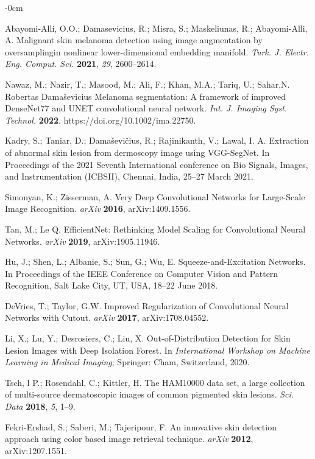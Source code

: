\documentclass[sensors,article,accept,pdftex,moreauthors]{Definitions/mdpi}
\begin{document}
\begin{adjustwidth}{-\extralength}{0cm}
\begin{thebibliography}{999}
Abayomi-Alli, O.O.; Damasevicius, R.; Misra, S.; Maskeliunas, R.; Abayomi-Alli, A. Malignant skin melanoma detection using image augmentation by oversamplingin nonlinear lower-dimensional embedding manifold. \emph{Turk. J. Electr. Eng. Comput. Sci.} {\bf 2021}, \emph{29}, 2600--2614.

Nawaz, M.; Nazir, T.; Masood, M.; Ali, F.;
Khan, M.A.; Tariq, U.; Sahar,N. 
Robertas Damaševicius Melanoma segmentation: A framework of improved DenseNet77 and UNET convolutional neural network.
{\em Int. J. Imaging Syst. Technol.} 
{\bf 2022}. https://doi.org/10.1002/ima.22750.

Kadry, S.; Taniar, D.; Damaševičius, R.; Rajinikanth, V.; Lawal, I. A. Extraction of abnormal skin lesion from dermoscopy image using VGG-SegNet. In Proceedings of the 2021 Seventh International conference on Bio Signals, Images, and Instrumentation (ICBSII), Chennai, India, 25--27 March 2021.

Simonyan, K.; Zisserman, A. Very Deep Convolutional Networks for Large-Scale Image Recognition.
{\em arXiv} 
{\bf 2016}, arXiv:1409.1556.

Tan, M.; Le Q. EfficientNet: Rethinking Model Scaling for Convolutional Neural Networks.
{\em arXiv} 
{\bf 2019}, 	arXiv:1905.11946.

Hu, J.; Shen, L.; Albanie, S.; Sun, G.; Wu, E. Squeeze-and-Excitation Networks.
In Proceedings of the IEEE Conference on Computer Vision and {Pattern Recognition,} Salt Lake City, UT, USA, 18--22 June 2018.

DeVries, T.; Taylor, G.W. Improved Regularization of Convolutional Neural Networks with Cutout. 
{\em arXiv} 
{\bf 2017}, arXiv:1708.04552.


Li, X.; Lu, Y.; Desrosiers, C.; Liu, X. Out-of-Distribution Detection for Skin Lesion Images with Deep Isolation Forest. In \emph{International Workshop on Machine Learning in Medical Imaging}; Springer: Cham, Switzerland, 
{2020}.

Tsch, l P.; Rosendahl, C.; Kittler, H. The HAM10000 data set, a large collection of multi-source dermatoscopic images of common pigmented skin lesions. 
{\em Sci. Data} 
{\bf 2018}, \emph{5}, 1--9.

Fekri-Ershad, S.; Saberi, M.; Tajeripour, F. An innovative skin detection approach using color based image retrieval technique.
{\em arXiv} 
{\bf 2012}, arXiv:1207.1551.


\end{thebibliography}
\end{adjustwidth}
\end{document}
